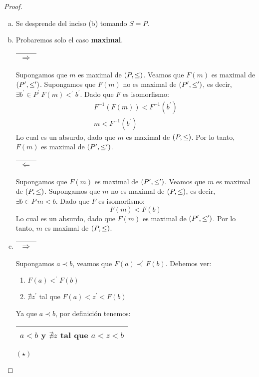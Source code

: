 \begin{proof}
\begin{enumerate}[a)]
      \item Se desprende del inciso (b) tomando $S = P$.
      \item Probaremos solo el caso \textbf{maximal}.
        \PN \begin{tabular}{|c|} \hline $\Rightarrow$ \\\hline \end{tabular} Supongamos que $m$ es maximal de
        $(P, \leq)$. Veamos que $F(m)$ es maximal de $(P^{\prime}, \leq^{\prime})$. Supongamos que $F(m)$ no es maximal
        de $(P^{\prime}, \leq^{\prime})$, es decir, $\exists b^{\prime} \in P^{\prime} \ F(m) <^{\prime} b^{\prime}$.
        Dado que $F$ es isomorfismo:
        \begin{eqnarray*}
    			F^{-1}(F(m)) < F^{-1}(b^{\prime}) \\
    			m < F^{-1}(b^{\prime})
    		\end{eqnarray*}
        \PN Lo cual es un absurdo, dado que $m$ es maximal de $(P, \leq)$. Por lo tanto, $F(m)$ es maximal de
        $(P^{\prime}, \leq^{\prime})$.

        \PN \begin{tabular}{|c|} \hline $\Leftarrow$ \\\hline \end{tabular} Supongamos que $F(m)$ es maximal de
        $(P^{\prime}, \leq^{\prime})$. Veamos que $m$ es maximal de $(P, \leq)$. Supongamos que $m$ no es maximal
        de $(P, \leq)$, es decir, $\exists b \in P \ m < b$. Dado que $F$ es isomorfismo:
        \[
    			F(m) < F(b)
    		\]
        \PN Lo cual es un absurdo, dado que $F(m)$ es maximal de $(P^{\prime}, \leq^{\prime})$. Por lo tanto, $m$ es
        maximal de $(P, \leq)$.

      \item \begin{tabular}{|c|} \hline $\Rightarrow$ \\\hline \end{tabular} Supongamos $a \prec b$, veamos que $F(a)
        \prec^{\prime} F(b)$. Debemos ver:
        \begin{enumerate}[(1)]
          \item $F(a) <^{\prime} F(b)$
          \item $\nexists z^{\prime}$ tal que $F(a) < z^{\prime} < F(b)$
        \end{enumerate}

        \PN Ya que $a \prec b$, por definición tenemos: \begin{tabular}{|c|} \hline $a < b$ y $\nexists z$ tal que
        $a < z < b$ \\\hline \end{tabular} $(\star)$


\end{enumerate}
\end{proof}

